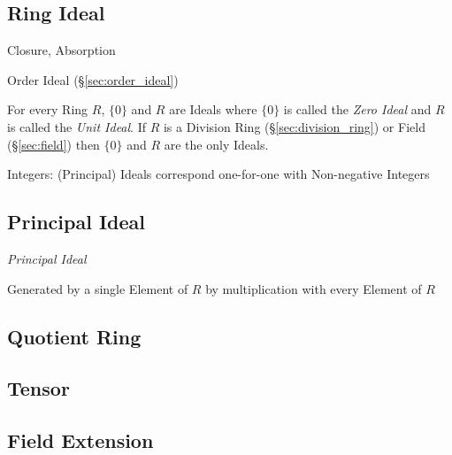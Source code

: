 \subsection{Ring Ideal}\label{sec:ring_ideal}

Closure, Absorption

Order Ideal (\S\ref{sec:order_ideal})

For every Ring $R$, $\{0\}$ and $R$ are Ideals where $\{0\}$ is called
the \emph{Zero Ideal} and $R$ is called the \emph{Unit Ideal}. If $R$
is a Division Ring (\S\ref{sec:division_ring}) or Field
(\S\ref{sec:field}) then $\{0\}$ and $R$ are the only Ideals.

Integers: (Principal) Ideals correspond one-for-one with Non-negative Integers



\subsection{Principal Ideal}\label{sec:principal_ideal}

\emph{Principal Ideal}

Generated by a single Element of $R$ by multiplication with every
Element of $R$



\subsection{Quotient Ring}\label{sec:quotient_ring}

\subsection{Tensor}\label{sec:tensor}

\subsection{Field Extension}\label{sec:field_extension}



